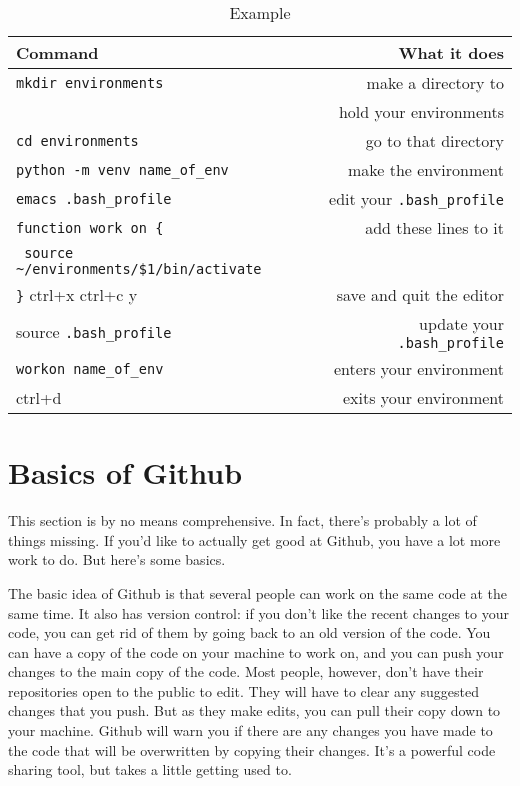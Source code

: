 \documentclass{article}
\begin{document}
\begin{table}
        \begin{center}
                \caption{Example}
                \label{venv}
                \begin{tabular}{l|r}
                  \textbf{Command} & \textbf{What it does}\\
                  \hline
                  \verb|mkdir environments| & make a directory to \\
                                   & hold your environments \\
                  \verb|cd environments| & go to that directory \\
                  \verb|python -m venv name_of_env| & make the
                                                      environment \\
                  \verb|emacs .bash_profile| & edit your
                                               \verb|.bash_profile|\\
                  \verb|function work on {| & add these lines to it \\
                  \verb| source ~/environments/$1/bin/activate| & \\
                  \verb|}|
                  ctrl+x ctrl+c y & save and quit the editor \\
                  source \verb|.bash_profile| & update your
                                                \verb|.bash_profile|\\
                  \verb|workon name_of_env| & enters your environment
                  \\
                  ctrl+d & exits your environment \\
                \end{tabular}
        \end{center}
\end{table}

\section{Basics of Github}

This section is by no means comprehensive. In fact, there's probably a
lot of things missing. If you'd like to actually get good at Github,
you have a lot more work to do. But here's some basics.

The basic idea of Github is that several people can work on the same
code at the same time. It also has version control: if you don't like
the recent changes to your code, you can get rid of them by going back
to an old version of the code. You can have a copy of the code on your
machine to work on, and you can push your changes to the main copy of
the code. Most people, however, don't have their repositories open to
the public to edit. They will have to clear any suggested changes that
you push. But as they make edits, you can pull their copy down to your
machine. Github will warn you if there are any changes you have made
to the code that will be overwritten by copying their changes. It's a
powerful code sharing tool, but takes a little getting used to.
\end{document}

